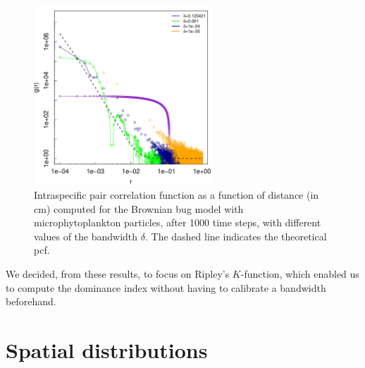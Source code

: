 \documentclass[english]{article}
\begin{document}
\begin{figure}[H]
\begin{centering}
\includegraphics[width=0.6\textwidth]{../code/figure/bandwidth_BBM}
\par\end{centering}
\caption{Intraspecific pair correlation function as a function of distance
(in cm) computed for the Brownian bug model with microphytoplankton
particles, after 1000 time steps, with different values of the bandwidth
$\delta$. The dashed line indicates the theoretical pcf.\label{fig:bandwidth_BBM}
}
\end{figure}

We decided, from these results, to focus on Ripley's $K$-function,
which enabled us to compute the dominance index without having to
calibrate a bandwidth beforehand. 

\section{Spatial distributions}
\end{document}
